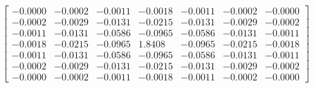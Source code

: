 \documentclass[preview]{standalone}
\begin{document}
\begin{align*}
\begin{bmatrix}-0.0000 & -0.0002 & -0.0011 & -0.0018 & -0.0011 & -0.0002 & -0.0000 \\ -0.0002 & -0.0029 & -0.0131 & -0.0215 & -0.0131 & -0.0029 & -0.0002 \\ -0.0011 & -0.0131 & -0.0586 & -0.0965 & -0.0586 & -0.0131 & -0.0011 \\ -0.0018 & -0.0215 & -0.0965 & 1.8408 & -0.0965 & -0.0215 & -0.0018 \\ -0.0011 & -0.0131 & -0.0586 & -0.0965 & -0.0586 & -0.0131 & -0.0011 \\ -0.0002 & -0.0029 & -0.0131 & -0.0215 & -0.0131 & -0.0029 & -0.0002 \\ -0.0000 & -0.0002 & -0.0011 & -0.0018 & -0.0011 & -0.0002 & -0.0000\end{bmatrix}
\end{align*}
\end{document}
